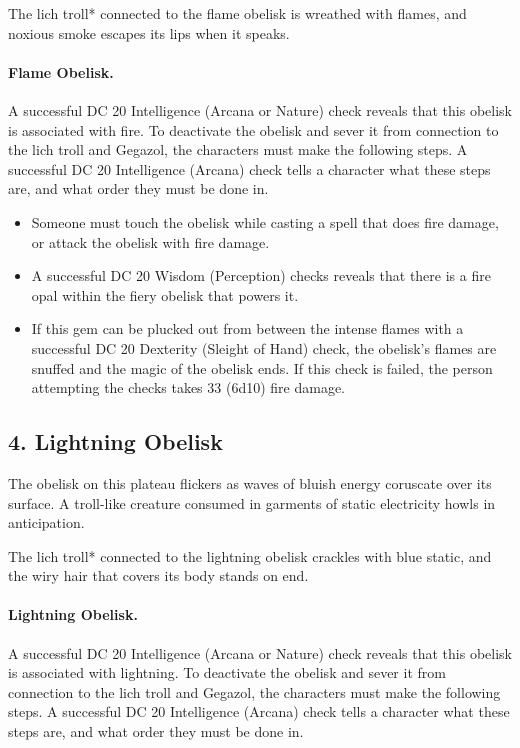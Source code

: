 \documentclass[10pt,a4paper,twoside,twocolumn,openany,bg=print,nodeprecatedcode]{dndbook}
\begin{document}
The lich troll* connected to the flame obelisk is wreathed with flames, and noxious smoke escapes its lips when it speaks.
\paragraph{Flame Obelisk.}
A successful DC 20 Intelligence (Arcana or Nature) check reveals that this obelisk is associated with fire. To deactivate the obelisk and sever it from connection to the lich troll and Gegazol, the characters must make the following steps. A successful DC 20 Intelligence (Arcana) check tells a character what these steps are, and what order they must be done in.

\begin{itemize}
\item Someone must touch the obelisk while casting a spell that does fire damage, or attack the obelisk with fire damage.
\item A successful DC 20 Wisdom (Perception) checks reveals that there is a fire opal within the fiery obelisk that powers it.
\item If this gem can be plucked out from between the intense flames with a successful DC 20 Dexterity (Sleight of Hand) check, the obelisk's flames are snuffed and the magic of the obelisk ends. If this check is failed, the person attempting the checks takes 33 (6d10) fire damage.
\end{itemize}

\subsection{4. Lightning Obelisk}
\begin{DndReadAloud}{}
The obelisk on this plateau flickers as waves of bluish energy coruscate over its surface. A troll-like creature consumed in garments of static electricity howls in anticipation.
\end{DndReadAloud}

The lich troll* connected to the lightning obelisk crackles with blue static, and the wiry hair that covers its body stands on end.
\paragraph{Lightning Obelisk.}
A successful DC 20 Intelligence (Arcana or Nature) check reveals that this obelisk is associated with lightning. To deactivate the obelisk and sever it from connection to the lich troll and Gegazol, the characters must make the following steps. A successful DC 20 Intelligence (Arcana) check tells a character what these steps are, and what order they must be done in.
\end{document}
